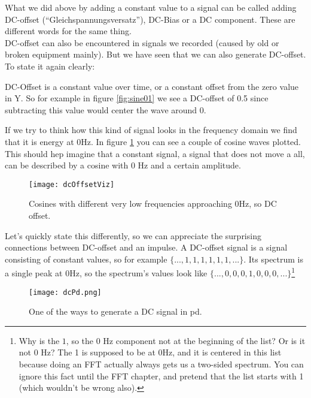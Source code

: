 What we did above by adding a constant value to a signal can be called adding DC-offset (``Gleichspannungsversatz''), DC-Bias or a DC component. These are different words for the same thing.\\
DC-offset can also be encountered in signals we recorded (caused by old or broken equipment mainly). But we have seen that we can also generate DC-offset.\\
To state it again clearly:
\begin{framed}
DC-Offset is a constant value over time, or a constant offset from the zero value in Y. So for example in figure \ref{fig:sine01} we see a DC-offset of 0.5 since subtracting this value would center the wave around 0.
\end{framed}
If we try to think how this kind of signal looks in the frequency domain we find that it is energy at 0Hz. In figure \ref{fig:dcViz} you can see a couple of cosine waves plotted. This should hep imagine that a constant signal, a signal that does not move a all, can be described by a cosine with 0 Hz and a certain amplitude.

\begin{figure}[h!]
	\centering
	\texttt{[image: dcOffsetViz]}
	\caption[shortCaption]
	{Cosines with different very low frequencies approaching 0Hz, so DC offset.}
	\label{fig:dcViz}
\end{figure}

Let's quickly state this differently, so we can appreciate the surprising connections between DC-offset and an impulse. A DC-offset signal is a signal consisting of constant values, so for example $\{...,1,1,1,1,1,1,...\}$. Its spectrum is a single peak at 0Hz, so the spectrum's values look like $\{..., 0,0,0,1,0,0,0,...\}$\footnote{Why is the $1$, so the 0 Hz component not at the beginning of the list? Or is it not 0 Hz? The 1 is supposed to be at 0Hz, and it is centered in this list because doing an FFT actually always gets us a two-sided spectrum. You can ignore this fact until the FFT chapter, and pretend that the list starts with 1 (which wouldn't be wrong also). }


\begin{figure}[H]
	\begin{center}
		\texttt{[image: dcPd.png]}
		\caption[Dc-offset in pd]
		{One of the ways to generate a DC signal in pd.}
		\label{fig:name}
	\end{center}
\end{figure}




